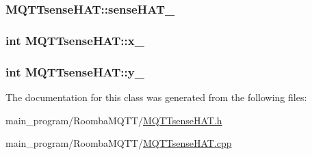 \subsubsection[{\texorpdfstring{sense\+H\+A\+T\+\_\+}{senseHAT_}}]{ M\+Q\+T\+Tsense\+H\+A\+T\+::sense\+H\+A\+T\+\_\+}\hypertarget{class_m_q_t_tsense_h_a_t_a50dfd49dde7594da4193b8b90f6c1048}{}\label{class_m_q_t_tsense_h_a_t_a50dfd49dde7594da4193b8b90f6c1048}
\subsubsection[{\texorpdfstring{x\+\_\+}{x_}}]{\setlength{\rightskip}{0pt plus 5cm}int M\+Q\+T\+Tsense\+H\+A\+T\+::x\+\_\+\hspace{0.3cm}{\ttfamily [protected]}}\hypertarget{class_m_q_t_tsense_h_a_t_a767f72e68bff1bf52e07b66f44ac40c8}{}\label{class_m_q_t_tsense_h_a_t_a767f72e68bff1bf52e07b66f44ac40c8}
\subsubsection[{\texorpdfstring{y\+\_\+}{y_}}]{\setlength{\rightskip}{0pt plus 5cm}int M\+Q\+T\+Tsense\+H\+A\+T\+::y\+\_\+\hspace{0.3cm}{\ttfamily [protected]}}\hypertarget{class_m_q_t_tsense_h_a_t_a608b724d2ab92ed1ea3b3c4c1066961d}{}\label{class_m_q_t_tsense_h_a_t_a608b724d2ab92ed1ea3b3c4c1066961d}


The documentation for this class was generated from the following files\+:\begin{DoxyCompactItemize}
\item 
main\+\_\+program/\+Roomba\+M\+Q\+T\+T/\hyperlink{_m_q_t_tsense_h_a_t_8h}{M\+Q\+T\+Tsense\+H\+A\+T.\+h}\item 
main\+\_\+program/\+Roomba\+M\+Q\+T\+T/\hyperlink{_m_q_t_tsense_h_a_t_8cpp}{M\+Q\+T\+Tsense\+H\+A\+T.\+cpp}\end{DoxyCompactItemize}
